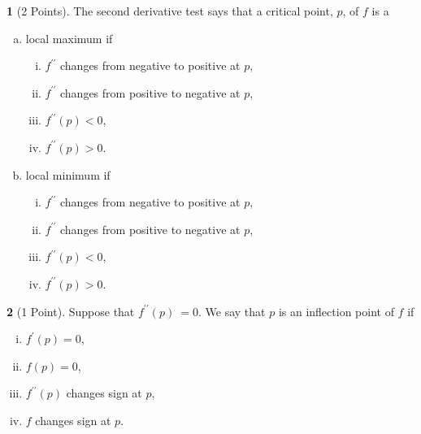 \documentclass[12pt]{amsart}
\theoremstyle{definition}
\newtheorem{thm}{}
\theoremstyle{definition}
\begin{document}
\begin{thm}[2 Points]
  The second derivative test says that a critical point, $p$, of $f$ is a
  \begin{enumerate}[(a)]
  \item
    local maximum if
    \begin{multicols}{2}
      \begin{enumerate}[(i)]
      \item
        $f^{\prime\prime}$ changes from negative to positive at $p$,
        \vspace{.05in}
      \item
        $f^{\prime\prime}$ changes from positive to negative at $p$,
      \item
        $f^{\prime\prime}(p) < 0$,
        \vspace{.05in}
      \item
        $f^{\prime\prime}(p) > 0$.
      \end{enumerate}
    \end{multicols}
  \item
    local minimum if
    \begin{multicols}{2}
      \begin{enumerate}[(i)]
        \item
        $f^{\prime\prime}$ changes from negative to positive at $p$,
        \vspace{.05in}
      \item
        $f^{\prime\prime}$ changes from positive to negative at $p$,
      \item
        $f^{\prime\prime}(p) < 0$,
        \vspace{.05in}
      \item
        $f^{\prime\prime}(p) > 0$.
      \end{enumerate}
    \end{multicols}
  \end{enumerate}
\end{thm}

\begin{thm}[1 Point]
  Suppose that $f^{\prime\prime}(p)\ = 0$.
  We say that $p$ is an inflection point of $f$ if
  \begin{multicols}{2}
    \begin{enumerate}[(i)]
    \item
      $f^{\prime}(p) = 0$,
      \vspace{.05in}
    \item
      $f(p) = 0$,
    \item
      $f^{\prime\prime}(p)$ changes sign at $p$,
      \vspace{.05in}
    \item
      $f$ changes sign at $p$.
    \end{enumerate}
  \end{multicols}
\end{thm}
\end{document}
